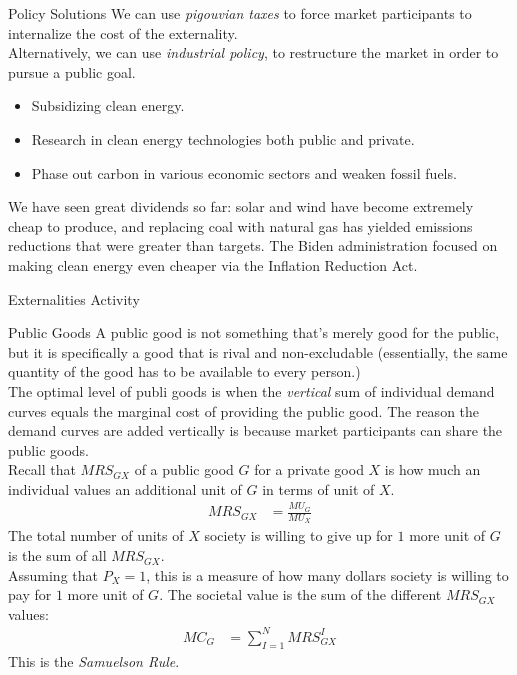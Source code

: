 \documentclass[10pt]{extarticle}
\begin{document}
  \begin{problem}{Policy Solutions}
    We can use \textit{pigouvian taxes} to force market participants to internalize the cost of the externality.\\

    Alternatively, we can use \textit{industrial policy}, to restructure the market in order to pursue a public goal.
    \begin{itemize}
      \item Subsidizing clean energy.
      \item Research in clean energy technologies both public and private.
      \item Phase out carbon in various economic sectors and weaken fossil fuels.
    \end{itemize}
    We have seen great dividends so far: solar and wind have become extremely cheap to produce, and replacing coal with natural gas has yielded emissions reductions that were greater than targets. The Biden administration focused on making clean energy even cheaper via the Inflation Reduction Act.
  \end{problem}
  \begin{problem}{Externalities Activity}
    \begin{tcbraster}[raster columns = 1,colframe = black!75!white,colback=white]
    \end{tcbraster}
  \end{problem}
  \begin{problem}{Public Goods}
    A public good is not something that's merely good for the public, but it is specifically a good that is rival and non-excludable (essentially, the same quantity of the good has to be available to every person.)\\

    The optimal level of publi goods is when the \textit{vertical} sum of individual demand curves equals the marginal cost of providing the public good. The reason the demand curves are added vertically is because market participants can share the public goods.\\

    Recall that $MRS_{GX}$ of a public good $G$ for a private good $X$ is how much an individual values an additional unit of $G$ in terms of unit of $X$.
    \begin{align*}
      MRS_{GX} &= \frac{MU_G}{MU_X}
    \end{align*}
    The total number of units of $X$ society is willing to give up for $1$ more unit of $G$ is the sum of all $MRS_{GX}$.\\

    Assuming that $P_X = 1$, this is a measure of how many dollars society is willing to pay for $1$ more unit of $G$. The societal value is the sum of the different $MRS_{GX}$ values:
    \begin{align*}
      MC_G &= \sum_{I=1}^{N} MRS_{GX}^I
    \end{align*}
    This is the \textit{Samuelson Rule}.
  \end{problem}
\end{document}
